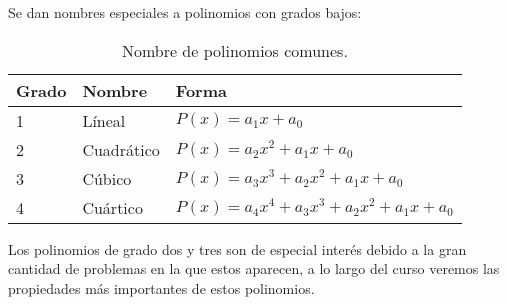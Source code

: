 Se dan nombres especiales a polinomios con grados bajos:
\begin{table}[H]
    \centering
    \begin{tabular}{p{1.5cm} p{2.5cm} p{6.5cm}}
        \hline
        Grado & Nombre & Forma \\
        \hline \hline
        1 & Líneal & $P(x) = a_1 x + a_0$\\
        2 & Cuadrático & $P(x) = a_2 x^2 + a_1 x + a_0$\\
        3 & Cúbico & $P(x) = a_3 x^3 + a_2 x^2 + a_1 x + a_0$\\
        4 & Cuártico & $P(x) = a_4 x^4 + a_3 x^3 + a_2 x^2 + a_1 x + a_0$\\
        \hline
    \end{tabular}
    \caption{Nombre de polinomios comunes.}
\end{table}
Los polinomios de grado dos y tres son de especial interés debido a la gran cantidad de problemas en la que estos aparecen, a lo largo del curso veremos las propiedades más importantes de estos polinomios.

